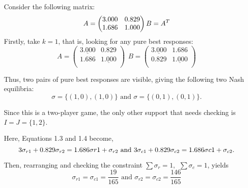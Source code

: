 Consider the following matrix:
\begin{equation}
    A = \begin{pmatrix}
        3.000 & 0.829 \\
        1.686 & 1.000 \\
    \end{pmatrix} \\
    B = A^{T}
\end{equation}\label{eqn:supp_en_ex}
Firstly, take \(k = 1\), that is, looking for any pure best responses:
\begin{displaymath}
    A = \begin{pmatrix}
        \underline{3.000} & 0.829 \\
        1.686 & \underline{1.000} \\
    \end{pmatrix} ~~ B = \begin{pmatrix}
        \underline{3.000} & 1.686 \\
        0.829 & \underline{1.000} \\
    \end{pmatrix}
\end{displaymath}

Thus, two pairs of pure best responses are visible, giving the following two
Nash equilibria:
\begin{displaymath}
    \sigma = \{(1, 0), (1, 0)\} \text{   and   } \sigma = \{(0, 1), (0, 1)\}.
\end{displaymath}

Since this is a two-player game, the only other support that needs checking is
\(I = J = \{1, 2\}\). 

Here, Equations 1.3 and 1.4 become,
\begin{displaymath}
    3\sigma_{r1} + 0.829\sigma_{r2} = 1.686\sigma{r1} + \sigma_{r2} \text{   and   } \\
    3\sigma_{c1} + 0.829\sigma_{c2} = 1.686\sigma{c1} + \sigma_{c2}.
\end{displaymath}

Then, rearranging and checking the constraint \(\sum{\sigma_{r} = 1}, ~~
\sum{\sigma_{c} = 1}\), yields 
\begin{displaymath}
    \sigma_{r1} = \sigma_{c1} = \frac{19}{165} \text{ and } \sigma_{r2} = \sigma_{c2} = \frac{146}{165}
\end{displaymath}

